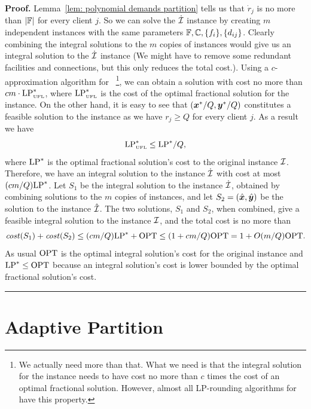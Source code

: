 \documentclass[oneside,final]{ucr}
\newenvironment{proof}[1][Proof]{\textbf{#1.} }{\ \rule{0.5em}{0.5em}}
\begin{document}
\begin{proof}
  Lemma~\ref{lem: polynomial demands partition} tells us
  that $\dot r_j$ is no more than $|\mathbb{F}|$ for every
  client $j$. So we can solve the $\dot {\mathcal{I}}$ instance by
  creating $m$ independent {\UFL} instances with the same
  parameters $\mathbb{F}, \mathbb{C}, \{f_i\},
  \{d_{ij}\}$. Clearly combining the integral solutions to
  the $m$ copies of {\UFL} instances would give us an
  integral solution to the $\dot {\mathcal{I}}$ instance (We might
  have to remove some redundant facilities and connections,
  but this only reduces the total cost.). Using a
  $c$-approximation algorithm for {\UFL}~\footnote{We
    actually need more than that. What we need is that the
    integral solution for the {\UFL} instance needs to have
    cost no more than $c$ times the cost of an optimal
    fractional solution. However, almost all LP-rounding
    algorithms for {\UFL} have this property.}, we can
  obtain a solution with cost no more than $c m \cdot
  \mbox{\rm LP}_{\mbox{\tiny\rm UFL}}^\ast$, where $\mbox{\rm LP}_{\mbox{\tiny\rm UFL}}^\ast$ is the
  cost of the optimal fractional solution for the {\UFL}
  instance. On the other hand, it is easy to see that
  $(\boldsymbol{x}^\ast/Q,\boldsymbol{y}^\ast/Q)$ constitutes a feasible
  solution to the {\UFL} instance as we have $r_j \geq Q$
  for every client $j$. As a result we have
  \begin{equation*}
    \mbox{\rm LP}_{\mbox{\tiny\rm UFL}}^\ast \leq \mbox{\rm LP}^\ast / Q,
  \end{equation*}
  where $\mbox{\rm LP}^\ast$ is the optimal fractional solution's cost
  to the original {\FTFP} instance $\mathcal{I}$. Therefore, we
  have an integral solution to the instance $\dot{\mathcal{I}}$ with
  cost at most $(cm/Q) \mbox{\rm LP}^\ast$. Let $S_1$ be the integral
  solution to the instance $\dot{\mathcal{I}}$, obtained by
  combining solutions to the $m$ copies of {\UFL} instances,
  and let $S_2 = (\hat{\boldsymbol{x}},\hat{\boldsymbol{y}})$ be the solution to the
  instance $\hat{\mathcal{I}}$. The two solutions, $S_1$ and $S_2$,
  when combined, give a feasible integral solution to the
  instance $\mathcal{I}$, and the total cost is no more than
  \begin{equation*}
    {\it cost}(S_1) + {\it cost}(S_2) \leq (cm/Q) \mbox{\rm LP}^\ast + \mbox{\rm OPT} \leq (1 +
    cm/Q) \mbox{\rm OPT} = 1 + O(m/Q) \mbox{\rm OPT}.
  \end{equation*}
  As usual $\mbox{\rm OPT}$ is the optimal integral solution's cost
  for the original {\FTFP} instance and $\mbox{\rm LP}^\ast \leq \mbox{\rm OPT}$
  because an integral solution's cost is lower bounded by
  the optimal fractional solution's cost.
\end{proof}


\section{Adaptive Partition}
\label{sec: adaptive partitioning}
\end{document}
